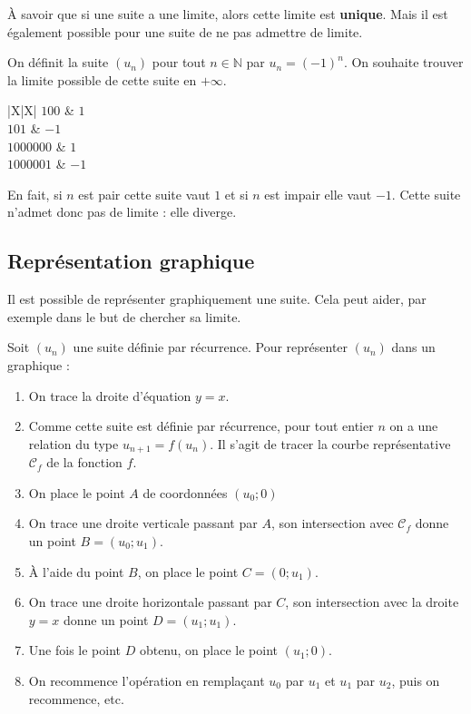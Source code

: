	À savoir que si une suite a une limite, alors cette limite est \textbf{unique}. Mais il est également possible pour une suite de ne pas admettre de limite.

	\begin{tip}[Exemple]
		On définit la suite $(u_n)$ pour tout $n \in \mathbb{N}$ par $u_n = (-1)^n$. On souhaite trouver la limite possible de cette suite en $+ \infty$.
		\newpar
		\begin{whitetabularx}{|X|X|}
			\hline
			$100$ & $1$ \\
			\hline
			$101$ & $-1$ \\
			\hline
			$1 000 000$ & $1$ \\
			\hline
			$1 000 001$ & $-1$ \\
			\hline
		\end{whitetabularx}
		\newpar
		En fait, si $n$ est pair cette suite vaut $1$ et si $n$ est impair elle vaut $-1$. Cette suite n'admet donc pas de limite : elle diverge.
	\end{tip}

	\subsection{Représentation graphique}

	Il est possible de représenter graphiquement une suite. Cela peut aider, par exemple dans le but de chercher sa limite.

	\begin{formula}
		Soit $(u_n)$ une suite définie par récurrence. Pour représenter $(u_n)$ dans un graphique :
		\begin{enumerate}
			\item On trace la droite d'équation $y = x$.
			\item  Comme cette suite est définie par récurrence, pour tout entier $n$ on a une relation du type $u_{n+1} = f(u_n)$. Il s'agit de tracer la courbe représentative $\mathcal{C}_f$ de la fonction $f$.
			\item On place le point $A$ de coordonnées $(u_0; 0)$
			\item On trace une droite verticale passant par $A$, son intersection avec $\mathcal{C}_f$ donne un point $B = (u_0; u_1)$.
			\item À l'aide du point $B$, on place le point $C = (0; u_1)$.
			\item On trace une droite horizontale passant par $C$, son intersection avec la droite $y = x$ donne un point $D = (u_1; u_1)$.
			\item Une fois le point $D$ obtenu, on place le point $(u_1; 0)$.
			\item On recommence l'opération en remplaçant $u_0$ par $u_1$ et $u_1$ par $u_2$, puis on recommence, etc.
		\end{enumerate}
	\end{formula}

